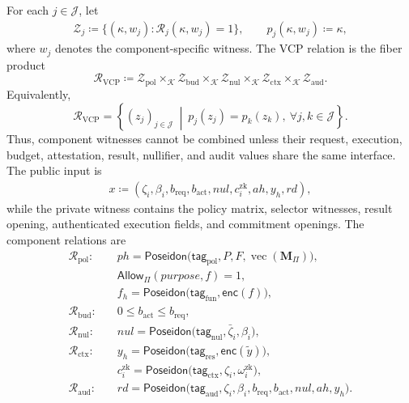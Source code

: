 \documentclass[10pt,journal,compsoc]{IEEEtran}
\begin{document}
For each $j\in\mathcal{J}$, let
\begin{equation}
\begin{aligned}
\mathcal{Z}_j
\coloneqq
\{(\kappa,w_j):
\mathcal{R}_j(\kappa,w_j)=1\},
\qquad
p_j(\kappa,w_j)\coloneqq\kappa,
\end{aligned}
\end{equation}
where $w_j$ denotes the component-specific witness. The VCP relation is the fiber product
\begin{equation}
\mathcal{R}_{\mathrm{VCP}}\coloneqq
\mathcal{Z}_{\mathrm{pol}}\times_{\mathcal{K}}\mathcal{Z}_{\mathrm{bud}}
\times_{\mathcal{K}}\mathcal{Z}_{\mathrm{nul}}\times_{\mathcal{K}}
\mathcal{Z}_{\mathrm{ctx}}\times_{\mathcal{K}}\mathcal{Z}_{\mathrm{aud}}.
\label{eq:vcp_fiber_product}
\end{equation}
Equivalently,
\begin{equation}
\mathcal{R}_{\mathrm{VCP}}
=
\left\{
(z_j)_{j\in\mathcal{J}}
\ \middle|\
p_j(z_j)=p_k(z_k),\
\forall j,k\in\mathcal{J}
\right\}.
\label{eq:fiber_product_equalizer}
\end{equation}
Thus, component witnesses cannot be combined unless their request, execution, budget, attestation, result, nullifier, and audit values share the same interface. The public input is
\begin{equation}
\begin{aligned}
x\coloneqq
(\zeta_i,\beta_i,b_{\mathrm{req}},b_{\mathrm{act}},
nul,c_i^{\mathrm{zk}},ah,y_h,rd),
\end{aligned}
\end{equation}
while the private witness contains the policy matrix, selector witnesses, result opening, authenticated execution fields, and commitment openings. The component relations are
\begin{equation}
\begin{aligned}
\mathcal{R}_{\mathrm{pol}}:\quad
&ph=\mathsf{Poseidon}
\bigl(\mathsf{tag}_{\mathrm{pol}},P,F,
\operatorname{vec}(\mathbf{M}_{\Pi})\bigr),\\
&\mathsf{Allow}_{\Pi}(purpose,f)=1,\\
&f_h=\mathsf{Poseidon}
\bigl(\mathsf{tag}_{\mathrm{fun}},\mathsf{enc}(f)\bigr),\\[1mm]
%
\mathcal{R}_{\mathrm{bud}}:\quad
&0\leq b_{\mathrm{act}}\leq b_{\mathrm{req}},\\[1mm]
%
\mathcal{R}_{\mathrm{nul}}:\quad
&nul=\mathsf{Poseidon}
\bigl(\mathsf{tag}_{\mathrm{nul}},
\bar{\zeta}_i,\beta_i\bigr),\\[1mm]
%
\mathcal{R}_{\mathrm{ctx}}:\quad
&y_h=\mathsf{Poseidon}
\bigl(\mathsf{tag}_{\mathrm{res}},
\mathsf{enc}(\widetilde{y})\bigr),\\
&c_i^{\mathrm{zk}}
=\mathsf{Poseidon}
\bigl(\mathsf{tag}_{\mathrm{ctx}},
\zeta_i,\omega_i^{\mathrm{zk}}\bigr),\\[1mm]
%
\mathcal{R}_{\mathrm{aud}}:\quad
&rd=\mathsf{Poseidon}
\bigl(\mathsf{tag}_{\mathrm{aud}},
\zeta_i,\beta_i,b_{\mathrm{req}},
b_{\mathrm{act}},nul,ah,y_h\bigr).
\end{aligned}
\label{eq:vcp_component_relations}
\end{equation}
\end{document}
